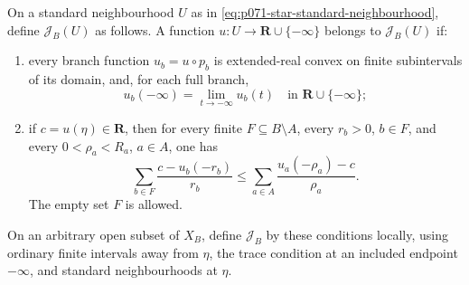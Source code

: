 On a standard neighbourhood \(U\) as in
\eqref{eq:p071-star-standard-neighbourhood}, define
\(\mathscr J_B(U)\) as follows.  A function
\(u:U\to\mathbf R\cup\{-\infty\}\) belongs to \(\mathscr J_B(U)\) if:
\begin{enumerate}
\item every branch function \(u_b=u\circ p_b\) is extended-real convex
  on finite subintervals of its domain, and, for each full branch,
  \begin{equation}
   u_b(-\infty)=\lim_{t\to-\infty}u_b(t)
             \quad\text{in }\mathbf R\cup\{-\infty\};
   \label{eq:p071-star-endpoint-trace}
  \end{equation}
\item if \(c=u(\eta)\in\mathbf R\), then for every finite
  \(F\subseteq B\setminus A\), every \(r_b>0\), \(b\in F\), and every
  \(0<\rho_a<R_a\), \(a\in A\), one has
  \begin{equation}
   \sum_{b\in F}\frac{c-u_b(-r_b)}{r_b}
       \leq
   \sum_{a\in A}\frac{u_a(-\rho_a)-c}{\rho_a}.
   \label{eq:p071-star-finite-point-balance}
  \end{equation}
  The empty set \(F\) is allowed.
\end{enumerate}
On an arbitrary open subset of \(X_B\), define \(\mathscr J_B\) by these
conditions locally, using ordinary finite intervals away from \(\eta\),
the trace condition at an included endpoint \(-\infty\), and standard
neighbourhoods at \(\eta\).

